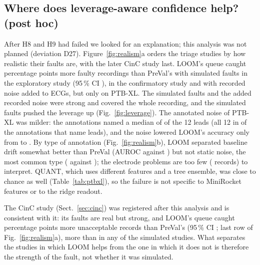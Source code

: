 \documentclass[preprint,12pt,authoryear]{elsarticle}
\begin{document}
\begin{table}[!htbp]
\caption{Hybrid triage at a 20\,\% budget: share of faulty recordings caught and automatic error. Confirmatory study (E13) and real ECG noise (E12): medians over datasets; PTB-XL (E20): mean over seeds. The primary hybrid catches the same recordings as LOOM by construction.}\label{tab:hybrid}
\centering\scriptsize

\end{table}

\subsection{Where does leverage-aware confidence help? (post hoc)}\label{sec:realism}
After H8 and H9 had failed we looked for an explanation; this analysis was not planned (deviation D27). Figure~\ref{fig:realism}a orders the triage studies by how realistic their faults are, with the later CinC study last. LOOM's queue caught \EffExplDiff{} percentage points more faulty recordings than PreVal's with simulated faults in the exploratory study (95\,\% CI \EffExplCI), \EffConfDiff{} \EffConfCI{} in the confirmatory study and \EffRNDiff{} \EffRNCI{} with recorded noise added to ECGs, but only \EffPTBDiff{} \EffPTBCI{} on PTB-XL. The simulated faults and the added recorded noise were strong and covered the whole recording, and the simulated faults pushed the leverage up (Fig.~\ref{fig:leverage}). The annotated noise of PTB-XL was milder: the annotations named a median of \LeadMedian{} of the 12 leads (all 12 in \LeadShareAll{} of the \LeadParsed{} annotations that name leads), and the noise lowered LOOM's accuracy only from \PTBAccCleanLoom{} to \PTBAccNoisyLoom. By type of annotation (Fig.~\ref{fig:realism}b), LOOM separated baseline drift somewhat better than PreVal (AUROC \PTBTypeDriftAUROCLoom{} against \PTBTypeDriftAUROCPreVal) but not static noise, the most common type (\PTBTypeStaticAUROCLoom{} against \PTBTypeStaticAUROCPreVal); the electrode problems are too few (\PTBTypeElectrodeN{} records) to interpret. QUANT, which uses different features and a tree ensemble, was close to chance as well (Table~\ref{tab:ptbxl}), so the failure is not specific to MiniRocket features or to the ridge readout.

The CinC study (Sect.~\ref{sec:cinc}) was registered after this analysis and is consistent with it: its faults are real but strong, and LOOM's queue caught \EffCincDiff{} percentage points more unacceptable records than PreVal's (95\,\% CI \EffCincCI; last row of Fig.~\ref{fig:realism}a), more than in any of the simulated studies. What separates the studies in which LOOM helps from the one in which it does not is therefore the strength of the fault, not whether it was simulated.
\end{document}
